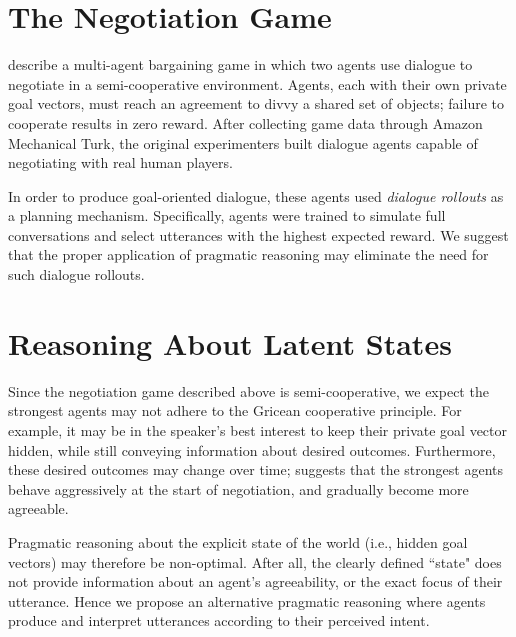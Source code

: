 \documentclass{article}
\begin{document}
\section{The Negotiation Game}

\citet{lewis2017deal} describe a multi-agent bargaining game in which two agents use dialogue to negotiate in a semi-cooperative environment. Agents, each with their own private goal vectors, must reach an agreement to divvy a shared set of objects; failure to cooperate results in zero reward. After collecting game data through Amazon Mechanical Turk, the original experimenters built dialogue agents capable of negotiating with real human players.

In order to produce goal-oriented dialogue, these agents used \textit{dialogue rollouts} as a planning mechanism. Specifically, agents were trained to simulate full conversations and select utterances with the highest expected reward. We suggest that the proper application of pragmatic reasoning may eliminate the need for such dialogue rollouts.

\section{Reasoning About Latent States}

Since the negotiation game described above is semi-cooperative, we expect the strongest agents may not adhere to the Gricean cooperative principle. For example, it may be in the speaker's best interest to keep their private goal vector hidden, while still conveying information about desired outcomes. Furthermore, these desired outcomes may change over time; \citet{chenbuilding} suggests that the strongest agents behave aggressively at the start of negotiation, and gradually become more agreeable.

Pragmatic reasoning about the explicit state of the world (i.e., hidden goal vectors) may therefore be non-optimal. After all, the clearly defined ``state" does not provide information about an agent's agreeability, or the exact focus of their utterance. Hence we propose an alternative pragmatic reasoning where agents produce and interpret utterances according to their perceived intent.





\end{document}
